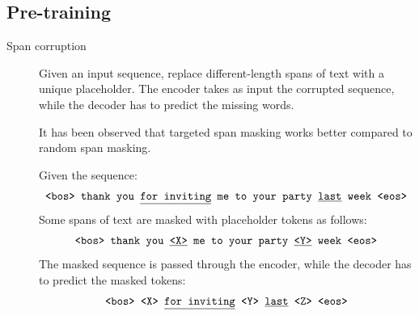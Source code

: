 \subsection{Pre-training}

\begin{description}
    \item[Span corruption] 
        Given an input sequence, replace different-length spans of text with a unique placeholder. The encoder takes as input the corrupted sequence, while the decoder has to predict the missing words.

        \begin{remark}
            It has been observed that targeted span masking works better compared to random span masking.
        \end{remark}

        \begin{example}
            Given the sequence:
            \[ \texttt{<bos> thank you \underline{for inviting} me to your party \underline{last} week <eos>} \]
            Some spans of text are masked with placeholder tokens as follows:
            \[ \texttt{<bos> thank you \underline{<X>} me to your party \underline{<Y>} week <eos>} \]
            The masked sequence is passed through the encoder, while the decoder has to predict the masked tokens:
            \[ \texttt{<bos> <X> \underline{for inviting} <Y> \underline{last} <Z> <eos>} \]
        \end{example}
\end{description}